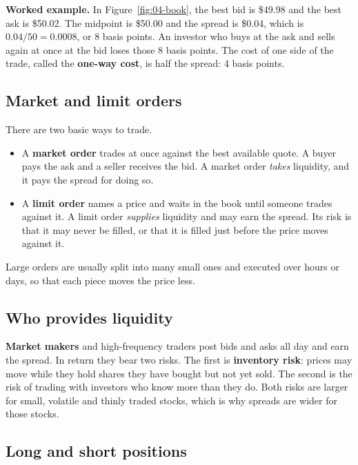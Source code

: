 \textbf{Worked example.} In Figure~\ref{fig:04-book}, the best bid is \$49.98 and the best ask is \$50.02. The midpoint is \$50.00 and the spread is \$0.04, which is $0.04/50 = 0.0008$, or 8 basis points. An investor who buys at the ask and sells again at once at the bid loses those 8 basis points. The cost of one side of the trade, called the \textbf{one-way cost}, is half the spread: 4 basis points.

\subsection{Market and limit orders}

There are two basic ways to trade.

\begin{itemize}
  \item A \textbf{market order} trades at once against the best available quote. A buyer pays the ask and a seller receives the bid. A market order \emph{takes} liquidity, and it pays the spread for doing so.
  \item A \textbf{limit order} names a price and waits in the book until someone trades against it. A limit order \emph{supplies} liquidity and may earn the spread. Its risk is that it may never be filled, or that it is filled just before the price moves against it.
\end{itemize}

Large orders are usually split into many small ones and executed over hours or days, so that each piece moves the price less.

\subsection{Who provides liquidity}

\textbf{Market makers} and high-frequency traders post bids and asks all day and earn the spread. In return they bear two risks. The first is \textbf{inventory risk}: prices may move while they hold shares they have bought but not yet sold. The second is the risk of trading with investors who know more than they do. Both risks are larger for small, volatile and thinly traded stocks, which is why spreads are wider for those stocks.

\subsection{Long and short positions}

